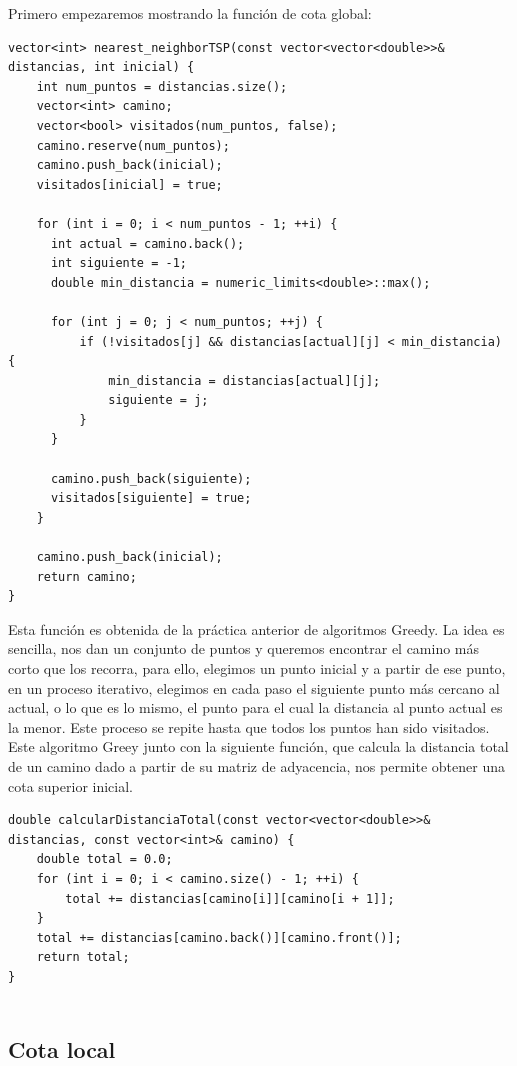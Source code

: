 \documentclass[11pt,openany]{book}
\begin{document}
Primero empezaremos mostrando la función de cota global:
\begin{lstlisting}
vector<int> nearest_neighborTSP(const vector<vector<double>>& distancias, int inicial) {
    int num_puntos = distancias.size();
    vector<int> camino;
    vector<bool> visitados(num_puntos, false);
    camino.reserve(num_puntos);
    camino.push_back(inicial);
    visitados[inicial] = true;

    for (int i = 0; i < num_puntos - 1; ++i) {
      int actual = camino.back();
      int siguiente = -1;
      double min_distancia = numeric_limits<double>::max();

      for (int j = 0; j < num_puntos; ++j) {
          if (!visitados[j] && distancias[actual][j] < min_distancia) {
              min_distancia = distancias[actual][j];
              siguiente = j;
          }
      }

      camino.push_back(siguiente);
      visitados[siguiente] = true;
    }

    camino.push_back(inicial);
    return camino;
}

\end{lstlisting} 
Esta función es obtenida de la práctica anterior de algoritmos Greedy. La idea es sencilla, nos dan un conjunto de 
puntos y queremos encontrar el camino más corto que los recorra, para ello, elegimos un punto inicial y a partir de 
ese punto, en un proceso iterativo, elegimos en cada paso el siguiente punto más cercano al actual, o lo que es lo mismo, 
el punto para el cual la distancia al punto actual es la menor. Este proceso se repite hasta que 
todos los puntos han sido visitados.
Este algoritmo Greey junto con la siguiente función, que calcula la distancia total de un camino dado a partir de su matriz
de adyacencia, nos permite obtener una cota superior inicial.
\\ 
\begin{lstlisting}
double calcularDistanciaTotal(const vector<vector<double>>& distancias, const vector<int>& camino) {
    double total = 0.0;
    for (int i = 0; i < camino.size() - 1; ++i) {
        total += distancias[camino[i]][camino[i + 1]];
    }
    total += distancias[camino.back()][camino.front()];
    return total;
}
      
\end{lstlisting}
\subsection{Cota local}
\end{document}
